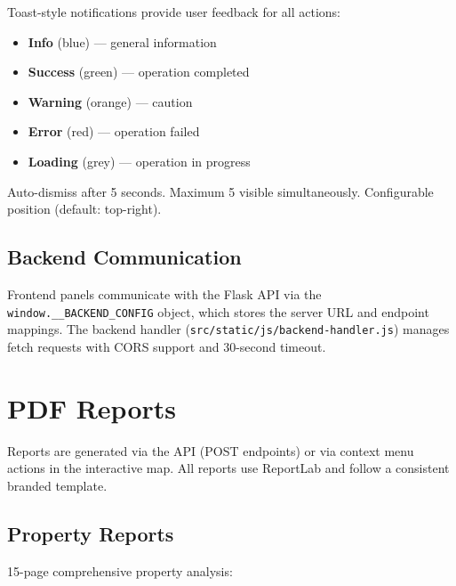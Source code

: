 \documentclass[11pt,a4paper]{article}
\begin{document}
Toast-style notifications provide user feedback for all actions:

\begin{itemize}[nosep]
    \item \textbf{Info} (blue) --- general information
    \item \textbf{Success} (green) --- operation completed
    \item \textbf{Warning} (orange) --- caution
    \item \textbf{Error} (red) --- operation failed
    \item \textbf{Loading} (grey) --- operation in progress
\end{itemize}

Auto-dismiss after 5 seconds. Maximum 5 visible simultaneously. Configurable
position (default: top-right).

\subsection{Backend Communication}

Frontend panels communicate with the Flask API via the
\texttt{window.\_\_BACKEND\_CONFIG} object, which stores the server URL and
endpoint mappings. The backend handler (\texttt{src/static/js/backend-handler.js})
manages fetch requests with CORS support and 30-second timeout.

\section{PDF Reports}

Reports are generated via the API (POST endpoints) or via context menu actions
in the interactive map. All reports use ReportLab and follow a consistent
branded template.

\subsection{Property Reports}

15-page comprehensive property analysis:
\end{document}
